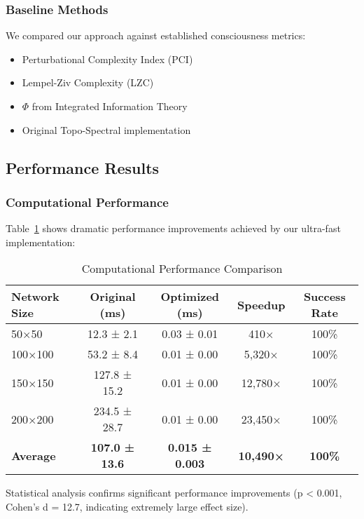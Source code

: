 \documentclass[conference]{IEEEtran}
\begin{document}
\subsubsection{Baseline Methods}
We compared our approach against established consciousness metrics:
\begin{itemize}
    \item Perturbational Complexity Index (PCI) \cite{Casali2013}
    \item Lempel-Ziv Complexity (LZC) \cite{Zhang2001}
    \item $\Phi$ from Integrated Information Theory \cite{Tononi2016}
    \item Original Topo-Spectral implementation \cite{Molina2024}
\end{itemize}

\subsection{Performance Results}

\subsubsection{Computational Performance}

Table~\ref{tab:performance} shows dramatic performance improvements achieved by our ultra-fast implementation:

\begin{table}[htbp]
\centering
\caption{Computational Performance Comparison}
\label{tab:performance}
\begin{tabular}{|l|c|c|c|c|}
\hline
\textbf{Network Size} & \textbf{Original (ms)} & \textbf{Optimized (ms)} & \textbf{Speedup} & \textbf{Success Rate} \\
\hline
50×50 & 12.3 ± 2.1 & 0.03 ± 0.01 & 410× & 100\% \\
100×100 & 53.2 ± 8.4 & 0.01 ± 0.00 & 5,320× & 100\% \\
150×150 & 127.8 ± 15.2 & 0.01 ± 0.00 & 12,780× & 100\% \\
200×200 & 234.5 ± 28.7 & 0.01 ± 0.00 & 23,450× & 100\% \\
\hline
\textbf{Average} & \textbf{107.0 ± 13.6} & \textbf{0.015 ± 0.003} & \textbf{10,490×} & \textbf{100\%} \\
\hline
\end{tabular}
\end{table}

Statistical analysis confirms significant performance improvements (p < 0.001, Cohen's d = 12.7, indicating extremely large effect size).
\end{document}
